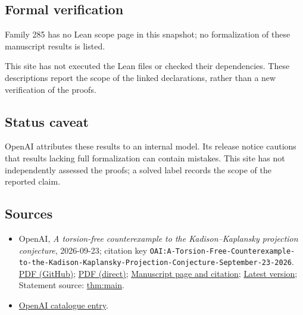 \documentclass[11pt]{article}
\begin{document}
\subsection{Formal verification}
Family 285 has no Lean scope page in this snapshot; no formalization of these manuscript results is listed.

This site has not executed the Lean files or checked their dependencies. These descriptions report the scope of the linked declarations, rather than a new verification of the proofs.

\subsection{Status caveat}
OpenAI attributes these results to an internal model. Its release notice cautions that results lacking full formalization can contain mistakes. This site has not independently assessed the proofs; a solved label records the scope of the reported claim.

\subsection{Sources}
\begin{itemize}
\item OpenAI, \emph{A torsion-free counterexample to the Kadison–Kaplansky projection conjecture}, 2026-09-23; citation key \texttt{OAI:A-Torsion-Free-Counterexample-to-the-Kadison-Kaplansky-Projection-Conjecture-September-23-2026}. \href{https://github.com/openai/math/blob/adc7f1241b42e322a6451854ab7e4b4c146bf78a/preprints/A-Torsion-Free-Counterexample-to-the-Kadison-Kaplansky-Projection-Conjecture-September-23-2026/paper.pdf}{PDF (GitHub)}; \href{https://github.com/openai/math/raw/adc7f1241b42e322a6451854ab7e4b4c146bf78a/preprints/A-Torsion-Free-Counterexample-to-the-Kadison-Kaplansky-Projection-Conjecture-September-23-2026/paper.pdf}{PDF (direct)}; \href{https://github.com/openai/math/blob/adc7f1241b42e322a6451854ab7e4b4c146bf78a/preprints/A-Torsion-Free-Counterexample-to-the-Kadison-Kaplansky-Projection-Conjecture-September-23-2026/README.md}{Manuscript page and citation}; \href{https://github.com/openai/math/blob/main/preprints/A-Torsion-Free-Counterexample-to-the-Kadison-Kaplansky-Projection-Conjecture-September-23-2026/paper.pdf}{Latest version}; Statement source: \href{https://github.com/openai/math/blob/adc7f1241b42e322a6451854ab7e4b4c146bf78a/preprints/A-Torsion-Free-Counterexample-to-the-Kadison-Kaplansky-Projection-Conjecture-September-23-2026/build/sections/introduction.tex\#L13}{thm:main}.
\item \href{https://github.com/openai/math/blob/adc7f1241b42e322a6451854ab7e4b4c146bf78a/CONTENTS.md}{OpenAI catalogue entry}.
\end{itemize}
\end{document}
